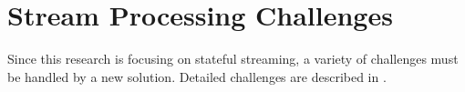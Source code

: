 %
%

\newpage
\section{Stream Processing Challenges}\label{sec:-challanges}
Since this research is focusing on stateful streaming,
a variety of challenges must be handled by a new solution.
Detailed challenges are described in \cite{spark_structured_streaming}.

